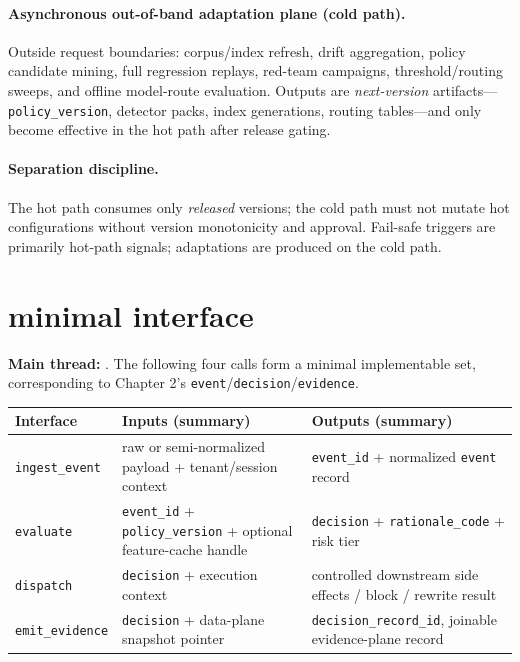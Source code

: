 \documentclass[11pt,a4paper]{report}
\begin{document}
\paragraph{Asynchronous out-of-band adaptation plane (cold path).} Outside request boundaries: corpus/index refresh, drift aggregation, policy candidate mining, full regression replays, red-team campaigns, threshold/routing sweeps, and offline model-route evaluation. Outputs are \emph{next-version} artifacts—\texttt{policy\_version}, detector packs, index generations, routing tables—and only become effective in the hot path after release gating.

\paragraph{Separation discipline.} The hot path consumes only \emph{released} versions; the cold path must not mutate hot configurations without version monotonicity and approval. Fail-safe triggers are primarily hot-path signals; adaptations are produced on the cold path.

\section{\SafetyKernel{} minimal interface}
\textbf{Main thread:} \DecoupledSafety{}. The following four calls form a minimal implementable set, corresponding to Chapter 2’s \texttt{event}/\texttt{decision}/\texttt{evidence}.

\begin{center}
\footnotesize
\begin{tabular}{@{}p{}p{}p{}@{}}
\toprule
\textbf{Interface} & \textbf{Inputs (summary)} & \textbf{Outputs (summary)} \\
\midrule
\texttt{ingest\_event} & raw or semi-normalized payload + tenant/session context & \texttt{event\_id} + normalized \texttt{event} record \\
\texttt{evaluate} & \texttt{event\_id} + \texttt{policy\_version} + optional feature-cache handle & \texttt{decision} + \texttt{rationale\_code} + risk tier \\
\texttt{dispatch} & \texttt{decision} + execution context & controlled downstream side effects / block / rewrite result \\
\texttt{emit\_evidence} & \texttt{decision} + data-plane snapshot pointer & \texttt{decision\_record\_id}, joinable evidence-plane record \\
\bottomrule
\end{tabular}
\end{center}
\end{document}
